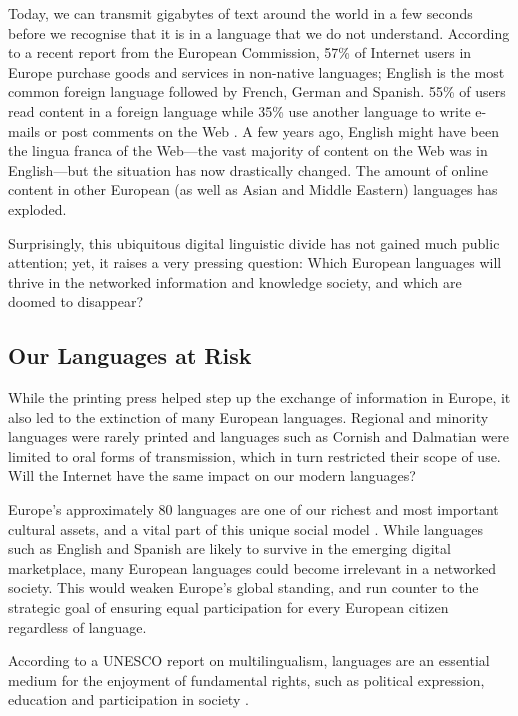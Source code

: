 \begin{multicols}{2}
Today, we can transmit gigabytes of text around the world in a few seconds before we recognise that it is in a language that we do not understand. According to a recent report from the European Commission, 57\% of Internet users in Europe purchase goods and services in non-native languages; English is the most common foreign language followed by French, German and Spanish. 55\% of users read content in a foreign language while 35\% use another language to write e-mails or post comments on the Web \cite{EC1}. A few years ago, English might have been the lingua franca of the Web—the vast majority of content on the Web was in English—but the situation has now drastically changed. The amount of online content in other European (as well as Asian and Middle Eastern) languages has exploded.

Surprisingly, this ubiquitous digital linguistic divide has not gained much public attention; yet, it raises a very pressing question: Which European languages will thrive in the networked information and knowledge society, and which are doomed to disappear?

\subsection{Our Languages at Risk}

While the printing press helped step up the exchange of information in Europe, it also led to the extinction of many European languages. Regional and minority languages were rarely printed and languages such as Cornish and Dalmatian were limited to oral forms of transmission, which in turn restricted their scope of use. Will the Internet have the same impact on our modern languages?

Europe’s approximately 80 languages are one of our richest and most important cultural assets, and a vital part of this unique social model \cite{EC2}. While languages such as English and Spanish are likely to survive in the emerging digital marketplace, many European languages could become irrelevant in a networked society. This would weaken Europe’s global standing, and run counter to the strategic goal of ensuring equal participation for every European citizen regardless of language.

According to a UNESCO report on multilingualism, languages are an essential medium for the enjoyment of fundamental rights, such as political expression, education and participation in society \cite{Unesco1}.



\end{multicols}
